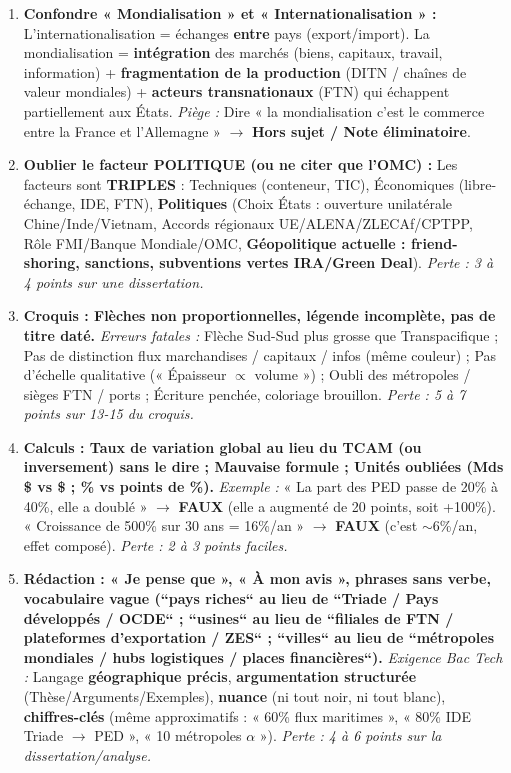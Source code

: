 \documentclass[11pt]{article}
\begin{document}
\begin{attention}
    \begin{enumerate}
        \item \textbf{Confondre « Mondialisation » et « Internationalisation » :} L'internationalisation = échanges \textbf{entre} pays (export/import). La mondialisation = \textbf{intégration} des marchés (biens, capitaux, travail, information) + \textbf{fragmentation de la production} (DITN / chaînes de valeur mondiales) + \textbf{acteurs transnationaux} (FTN) qui échappent partiellement aux États. \emph{Piège :} Dire « la mondialisation c'est le commerce entre la France et l'Allemagne » $\rightarrow$ \textbf{Hors sujet / Note éliminatoire}.
        \item \textbf{Oublier le facteur POLITIQUE (ou ne citer que l'OMC) :} Les facteurs sont \textbf{TRIPLES} : Techniques (conteneur, TIC), Économiques (libre-échange, IDE, FTN), \textbf{Politiques} (Choix États : ouverture unilatérale Chine/Inde/Vietnam, Accords régionaux UE/ALENA/ZLECAf/CPTPP, Rôle FMI/Banque Mondiale/OMC, \textbf{Géopolitique actuelle : friend-shoring, sanctions, subventions vertes IRA/Green Deal}). \emph{Perte : 3 à 4 points sur une dissertation.}
        \item \textbf{Croquis : Flèches non proportionnelles, légende incomplète, pas de titre daté.} \emph{Erreurs fatales :} Flèche Sud-Sud plus grosse que Transpacifique ; Pas de distinction flux marchandises / capitaux / infos (même couleur) ; Pas d'échelle qualitative (« Épaisseur $\propto$ volume ») ; Oubli des métropoles / sièges FTN / ports ; Écriture penchée, coloriage brouillon. \emph{Perte : 5 à 7 points sur 13-15 du croquis.}
        \item \textbf{Calculs : Taux de variation global au lieu du TCAM (ou inversement) sans le dire ; Mauvaise formule ; Unités oubliées (Mds \$ vs \$ ; \% vs points de \%).} \emph{Exemple :} « La part des PED passe de 20\% à 40\%, elle a doublé » $\rightarrow$ \textbf{FAUX} (elle a augmenté de 20 points, soit +100\%). « Croissance de 500\% sur 30 ans = 16\%/an » $\rightarrow$ \textbf{FAUX} (c'est $\sim$6\%/an, effet composé). \emph{Perte : 2 à 3 points faciles.}
        \item \textbf{Rédaction : « Je pense que », « À mon avis », phrases sans verbe, vocabulaire vague (``pays riches`` au lieu de ``Triade / Pays développés / OCDE`` ; ``usines`` au lieu de ``filiales de FTN / plateformes d'exportation / ZES`` ; ``villes`` au lieu de ``métropoles mondiales / hubs logistiques / places financières``).} \emph{Exigence Bac Tech :} Langage \textbf{géographique précis}, \textbf{argumentation structurée} (Thèse/Arguments/Exemples), \textbf{nuance} (ni tout noir, ni tout blanc), \textbf{chiffres-clés} (même approximatifs : « 60\% flux maritimes », « 80\% IDE Triade $\rightarrow$ PED », « 10 métropoles $\alpha$ »). \emph{Perte : 4 à 6 points sur la dissertation/analyse.}
    \end{enumerate}
\end{attention}
\end{document}
